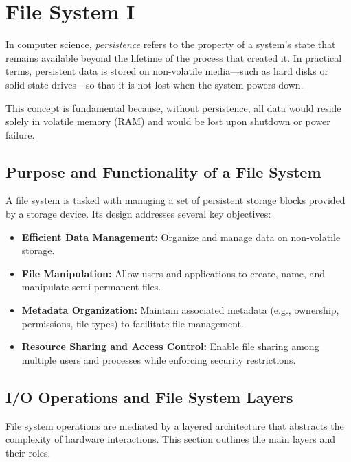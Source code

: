 \documentclass[../../compsys.tex]{subfiles}
\begin{document}
\chapter{File System I}
\vfill

\begin{definition}[Persistence]
In computer science, \emph{persistence} refers to the property of a system's state that remains available beyond the lifetime of the process that created it. In practical terms, persistent data is stored on non-volatile media—such as hard disks or solid-state drives—so that it is not lost when the system powers down.
\end{definition}
This concept is fundamental because, without persistence, all data would reside solely in volatile memory (RAM) and would be lost upon shutdown or power failure.

\section{Purpose and Functionality of a File System}
A file system is tasked with managing a set of persistent storage blocks provided by a storage device. Its design addresses several key objectives:
\begin{itemize}[itemsep=2pt, topsep=1pt]
  \item \textbf{Efficient Data Management:} Organize and manage data on non-volatile storage.
  \item \textbf{File Manipulation:} Allow users and applications to create, name, and manipulate semi-permanent files.
  \item \textbf{Metadata Organization:} Maintain associated metadata (e.g., ownership, permissions, file types) to facilitate file management.
  \item \textbf{Resource Sharing and Access Control:} Enable file sharing among multiple users and processes while enforcing security restrictions.
\end{itemize}

\newpage
\section{I/O Operations and File System Layers}
File system operations are mediated by a layered architecture that abstracts the complexity of hardware interactions. This section outlines the main layers and their roles.
\end{document}
